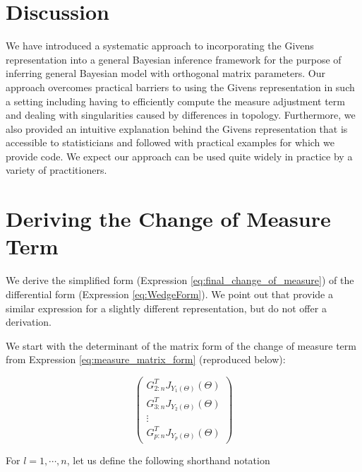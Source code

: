 \documentclass[ba]{imsart}
\numberwithin{equation}{section}
\theoremstyle{plain}
\begin{document}
\section{Discussion}\label{discussion}
We have introduced a systematic approach to incorporating the Givens representation into a general Bayesian inference framework for the purpose of inferring general Bayesian model with orthogonal matrix parameters. Our approach overcomes practical barriers to using the Givens representation in such a setting including having to efficiently compute the measure adjustment term and dealing with singularities caused by differences in topology. Furthermore, we also provided an intuitive explanation behind the Givens representation that is accessible to statisticians and followed with practical examples for which we provide code. We expect our approach can be used quite widely in practice by a variety of practitioners.

\appendix
\section{Deriving the Change of Measure Term}
We derive the simplified form (Expression \ref{eq:final_change_of_measure}) of the differential form (Expression \ref{eq:WedgeForm}). We point out that \cite{khatri1977mises} provide a similar expression for a slightly different representation, but do not offer a derivation.

\noindent We start with the determinant of the matrix form of the change of measure term from Expression \ref{eq:measure_matrix_form} (reproduced below):

\begin{equation}
\begin{pmatrix}
G_{2:n}^T J_{Y_1(\Theta)}(\Theta)\\
G_{3:n}^T J_{Y_2(\Theta)}(\Theta)\\
\vdots\\
G_{p:n}^T J_{Y_p(\Theta)}(\Theta)
\end{pmatrix}
\end{equation}

\noindent For $l = 1, \cdots, n$, let us define the following shorthand notation
\end{document}
